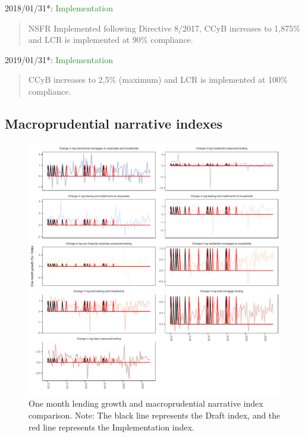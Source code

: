 \documentclass[
  letterpaper,
  DIV=11,
  numbers=noendperiod]{scrartcl}
\begin{document}
2018/01/31*: \textcolor{ForestGreen}{Implementation}

\begin{quote}
NSFR Implemented following  Directive 8/2017, CCyB increases to 1,875\% and LCR is implemented at 90\% compliance.
\end{quote}

2019/01/31*: \textcolor{ForestGreen}{Implementation}

\begin{quote}
CCyB increases to 2,5\% (maximum) and LCR is implemented at 100\% compliance.
\end{quote}

\hypertarget{macroprudential-narrative-indexes}{%
\subsection{Macroprudential narrative
indexes}\label{macroprudential-narrative-indexes}}

\begin{figure}[H]

{\centering \includegraphics{UP_paper_files/figure-pdf/fig-macro_narrative_indexes_one_month-1.pdf}

}

\caption{\label{fig-macro_narrative_indexes_one_month}One month lending
growth and macroprudential narrative index comparison. Note: The black
line represents the Draft index, and the red line represents the
Implementation index.}

\end{figure}
\end{document}

